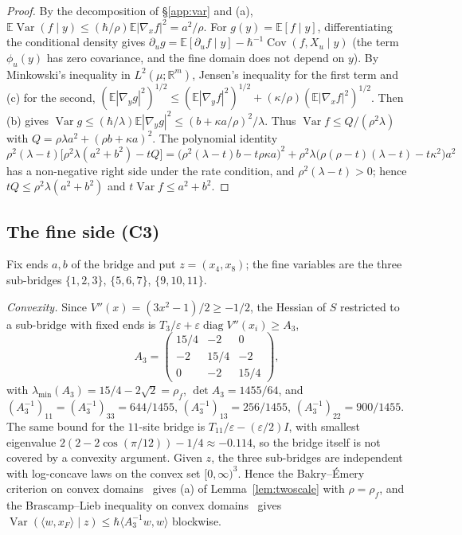 \documentclass[11pt,a4paper]{article}
\theoremstyle{definition}
\theoremstyle{remark}
\newcommand{\E}{\mathbb{E}}
\DeclareMathOperator{\Cov}{Cov}
\DeclareMathOperator{\Var}{Var}
\begin{document}
\begin{proof}
By the decomposition of \S\ref{app:var} and (a), $\E\Var(f\mid y)\le(\hbar/\rho)\E|\nabla_xf|^2=a^2/\rho$. For $g(y)=\E[f\mid y]$, differentiating the conditional density gives $\partial_ug=\E[\partial_uf\mid y]-\hbar^{-1}\Cov(f,X_u\mid y)$ (the term $\phi_u(y)$ has zero covariance, and the fine domain does not depend on $y$). By Minkowski's inequality in $L^2(\mu;\mathbb R^m)$, Jensen's inequality for the first term and (c) for the second, $(\E|\nabla_yg|^2)^{1/2}\le(\E|\nabla_yf|^2)^{1/2}+(\kappa/\rho)(\E|\nabla_xf|^2)^{1/2}$. Then (b) gives $\Var g\le(\hbar/\lambda)\E|\nabla_yg|^2\le(b+\kappa a/\rho)^2/\lambda$. Thus $\Var f\le Q/(\rho^2\lambda)$ with $Q=\rho\lambda a^2+(\rho b+\kappa a)^2$. The polynomial identity
\[
\rho^2(\lambda-t)\bigl[\rho^2\lambda(a^2+b^2)-tQ\bigr]=\bigl(\rho^2(\lambda-t)b-t\rho\kappa a\bigr)^2+\rho^2\lambda\bigl(\rho(\rho-t)(\lambda-t)-t\kappa^2\bigr)a^2
\]
has a non-negative right side under the rate condition, and $\rho^2(\lambda-t)>0$; hence $tQ\le\rho^2\lambda(a^2+b^2)$ and $t\Var f\le a^2+b^2$.
\end{proof}

\subsection{The fine side (C3)}\label{app:fine}
Fix ends $a,b$ of the bridge and put $z=(x_4,x_8)$; the fine variables are the three sub-bridges $\{1,2,3\}$, $\{5,6,7\}$, $\{9,10,11\}$.

\emph{Convexity.} Since $V''(x)=(3x^2-1)/2\ge-1/2$, the Hessian of $S$ restricted to a sub-bridge with fixed ends is $T_3/\varepsilon+\varepsilon\operatorname{diag}V''(x_i)\ge A_3$,
\[
A_3=\begin{pmatrix}15/4&-2&0\\-2&15/4&-2\\0&-2&15/4\end{pmatrix},
\]
with $\lambda_{\min}(A_3)=15/4-2\sqrt2=\rho_f$, $\det A_3=1455/64$, and $(A_3^{-1})_{11}=(A_3^{-1})_{33}=644/1455$, $(A_3^{-1})_{13}=256/1455$, $(A_3^{-1})_{22}=900/1455$. The same bound for the $11$-site bridge is $T_{11}/\varepsilon-(\varepsilon/2)I$, with smallest eigenvalue $2(2-2\cos(\pi/12))-1/4\approx-0.114$, so the bridge itself is not covered by a convexity argument. Given $z$, the three sub-bridges are independent with log-concave laws on the convex set $[0,\infty)^3$. Hence the Bakry--Émery criterion on convex domains~\cite{BE,KM} gives (a) of Lemma~\ref{lem:twoscale} with $\rho=\rho_f$, and the Brascamp--Lieb inequality on convex domains~\cite{BL,KM} gives $\Var(\langle w,x_F\rangle\mid z)\le\hbar\langle A_3^{-1}w,w\rangle$ blockwise.
\end{document}

